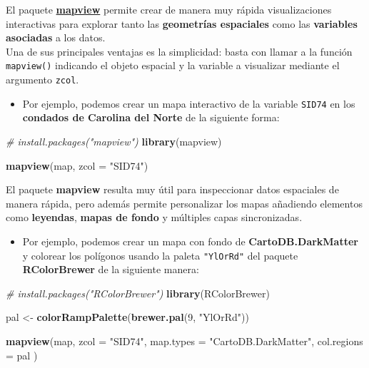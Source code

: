 \documentclass[
]{book}
\newenvironment{Shaded}{\begin{snugshade}}{\end{snugshade}}
\newcommand{\AttributeTok}[1]{\textcolor[rgb]{0.13,0.29,0.53}{#1}}
\newcommand{\CommentTok}[1]{\textcolor[rgb]{0.56,0.35,0.01}{\textit{#1}}}
\newcommand{\DecValTok}[1]{\textcolor[rgb]{0.00,0.00,0.81}{#1}}
\newcommand{\FunctionTok}[1]{\textcolor[rgb]{0.13,0.29,0.53}{\textbf{#1}}}
\newcommand{\NormalTok}[1]{#1}
\newcommand{\OtherTok}[1]{\textcolor[rgb]{0.56,0.35,0.01}{#1}}
\newcommand{\StringTok}[1]{\textcolor[rgb]{0.31,0.60,0.02}{#1}}
\providecommand{\tightlist}{%
  \setlength{\itemsep}{0pt}\setlength{\parskip}{0pt}}
\begin{document}
El paquete \href{https://r-spatial.github.io/mapview/}{\textbf{mapview}} permite crear de manera muy rápida visualizaciones interactivas para explorar tanto las \textbf{geometrías espaciales} como las \textbf{variables asociadas} a los datos.\\
Una de sus principales ventajas es la simplicidad: basta con llamar a la función \texttt{mapview()} indicando el objeto espacial y la variable a visualizar mediante el argumento \texttt{zcol}.

\begin{itemize}
\tightlist
\item
  Por ejemplo, podemos crear un mapa interactivo de la variable \texttt{SID74} en los \textbf{condados de Carolina del Norte} de la siguiente forma:
\end{itemize}

\begin{Shaded}
\begin{Highlighting}[]
\CommentTok{\# install.packages("mapview")}
\FunctionTok{library}\NormalTok{(mapview)}

\FunctionTok{mapview}\NormalTok{(map, }\AttributeTok{zcol =} \StringTok{"SID74"}\NormalTok{)}
\end{Highlighting}
\end{Shaded}

El paquete \textbf{mapview} resulta muy útil para inspeccionar datos espaciales de manera rápida, pero además permite personalizar los mapas añadiendo elementos como \textbf{leyendas}, \textbf{mapas de fondo} y múltiples capas sincronizadas.

\begin{itemize}
\tightlist
\item
  Por ejemplo, podemos crear un mapa con fondo de \textbf{CartoDB.DarkMatter} y colorear los polígonos usando la paleta \texttt{"YlOrRd"} del paquete \textbf{RColorBrewer} de la siguiente manera:
\end{itemize}

\begin{Shaded}
\begin{Highlighting}[]
\CommentTok{\# install.packages("RColorBrewer")}
\FunctionTok{library}\NormalTok{(RColorBrewer)}

\NormalTok{pal }\OtherTok{\textless{}{-}} \FunctionTok{colorRampPalette}\NormalTok{(}\FunctionTok{brewer.pal}\NormalTok{(}\DecValTok{9}\NormalTok{, }\StringTok{"YlOrRd"}\NormalTok{))}

\FunctionTok{mapview}\NormalTok{(map,}
  \AttributeTok{zcol =} \StringTok{"SID74"}\NormalTok{,}
  \AttributeTok{map.types =} \StringTok{"CartoDB.DarkMatter"}\NormalTok{,}
  \AttributeTok{col.regions =}\NormalTok{ pal}
\NormalTok{)}
\end{Highlighting}
\end{Shaded}
\end{document}
